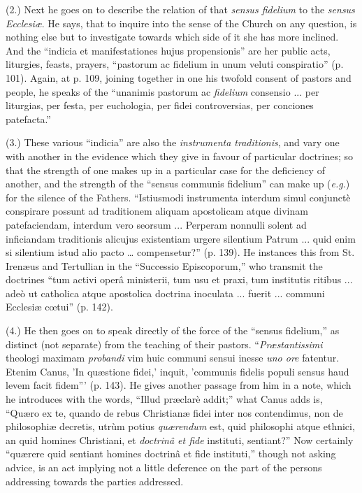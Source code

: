 (2.) Next he goes on to describe the relation of
that \emph{sensus fidelium} to the \emph{sensus Ecclesiæ}. He says,
that to inquire into the sense of the Church on any question, is nothing
else but to investigate towards which side of it she has more inclined.
And the ``indicia et manifestationes hujus propensionis'' are her public
acts, liturgies, feasts, prayers, ``pastorum ac fidelium in unum veluti
conspiratio'' (p. 101). Again, at p. 109, joining together in one his
twofold consent of pastors and people, he speaks of the ``unanimis
pastorum ac \emph{fidelium} consensio ... per liturgias, per festa, per
euchologia, per fidei controversias, per conciones patefacta.''

(3.) These various ``indicia'' are also the \emph{instrumenta
traditionis}, and vary one with another in the evidence which they
give in favour of particular doctrines; so that the strength of one
makes up in a particular case for the deficiency of another, and the
strength of the ``sensus communis fidelium'' can make up (\emph{e.g}.) for
the silence of the Fathers. ``Istiusmodi instrumenta interdum simul
conjunctè conspirare possunt ad traditionem aliquam apostolicam atque
divinam patefaciendam, interdum vero seorsum ... Perperam nonnulli
solent ad inficiandam traditionis alicujus existentiam urgere silentium
Patrum ... quid enim si silentium istud alio pacto … compensetur?'' (p.
139). He instances this from St. Irenæus and Tertullian in the ``Successio
Episcoporum,'' who transmit the doctrines ``tum activi operâ ministerii,
tum usu et praxi, tum institutis ritibus ... adeò ut catholica atque
apostolica doctrina inoculata ... fuerit ... communi Ecclesiæ cœtui''
(p. 142).

(4.) He then goes on to speak directly of the force
of the ``sensus fidelium,'' as distinct (not separate) from the teaching
of their pastors. ``\emph{Præstantissimi} theologi maximam \emph{probandi}
vim huic communi sensui inesse \emph{uno ore} fatentur. Etenim Canus, 'In
quæstione fidei,' inquit, 'communis fidelis populi sensus haud levem
facit fidem''' (p. 143). He gives another passage from him in a note,
which he introduces with the words, ``Illud præclarè addit;'' what Canus
adds is, ``Quæro ex te, quando de rebus Christianæ fidei inter nos
contendimus, non de philosophiæ decretis, utrùm potius \emph{quærendum}
est, quid philosophi atque ethnici, an quid homines Christiani, et \emph{doctrinâ
et fide} instituti, sentiant?'' Now certainly ``quærere quid sentiant
homines doctrinâ et fide instituti,'' though not asking advice, is an
act implying not a little deference on the part of the persons
addressing towards the parties addressed.

